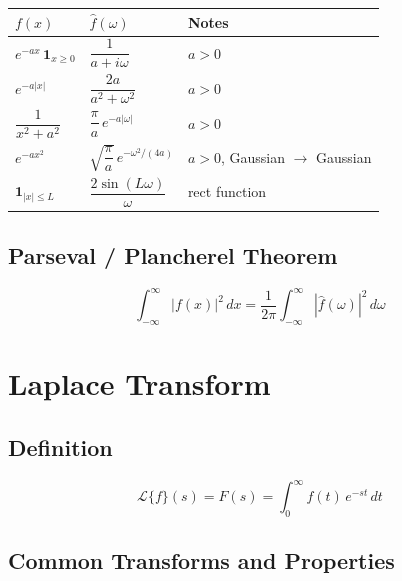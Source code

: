\documentclass[12pt, a4paper]{article}
\theoremstyle{definition}
\theoremstyle{remark}
\begin{document}
\begin{center}
\begin{tabular}{lll}
\toprule
$f(x)$ & $\hat{f}(\omega)$ & Notes \\
\midrule
$e^{-ax}\,\mathbf{1}_{x\ge 0}$ & $\dfrac{1}{a+i\omega}$ & $a>0$ \\[10pt]
$e^{-a|x|}$ & $\dfrac{2a}{a^2+\omega^2}$ & $a>0$ \\[10pt]
$\dfrac{1}{x^2+a^2}$ & $\dfrac{\pi}{a}\,e^{-a|\omega|}$ & $a>0$ \\[10pt]
$e^{-ax^2}$ & $\sqrt{\dfrac{\pi}{a}}\,e^{-\omega^2/(4a)}$ & $a>0$, Gaussian $\to$ Gaussian \\[10pt]
$\mathbf{1}_{|x|\le L}$ & $\dfrac{2\sin(L\omega)}{\omega}$ & rect function \\
\bottomrule
\end{tabular}
\end{center}

\subsection{Parseval / Plancherel Theorem}
\[
  \int_{-\infty}^\infty |f(x)|^2\,dx
  = \frac{1}{2\pi}\int_{-\infty}^\infty |\hat{f}(\omega)|^2\,d\omega
\]

\section{Laplace Transform}

\subsection{Definition}
\[
  \mathcal{L}\{f\}(s) = F(s) = \int_0^\infty f(t)\,e^{-st}\,dt
\]

\subsection{Common Transforms and Properties}
\end{document}

